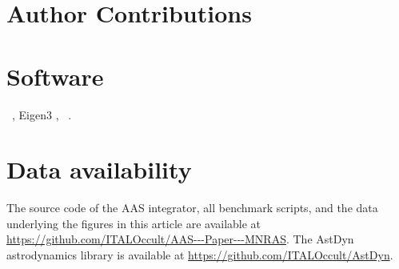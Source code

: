 \documentclass[fleqn,usenatbib]{rasti}
\begin{document}
\section*{Author Contributions}


\section*{Software}
\astdyn\ \citep{bigi_astdyn_2025},
Eigen3 \citep{eigenweb},
\rebound\ \citep{ReinLiu2012}.

\section*{Data availability}
The source code of the AAS integrator, all benchmark scripts, 
and the data underlying the figures in this article are available 
at \url{https://github.com/ITALOccult/AAS---Paper---MNRAS}. 
The AstDyn astrodynamics library is available at 
 \url{https://github.com/ITALOccult/AstDyn}.



\end{document}

